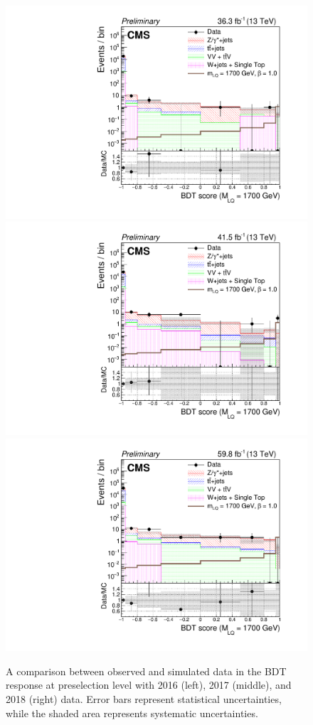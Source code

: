 \begin{figure}[H]
    {\includegraphics[width=.32\textwidth]{Images/Analysis/Results_2016_Unblinded/Plots/Preselection/BasicLQ_uujj_LQToBMu_pair_uubj_BDT_discrim_M1700_standard.pdf}}
    {\includegraphics[width=.32\textwidth]{Images/Analysis/Results_2017_Unblinded/Plots/Preselection/BasicLQ_uujj_LQToBMu_pair_uubj_BDT_discrim_M1700_standard.pdf}}
    {\includegraphics[width=.32\textwidth]{Images/Analysis/Results_2018_Unblinded/Plots/Preselection/BasicLQ_uujj_LQToBMu_pair_uubj_BDT_discrim_M1700_standard.pdf}}
    \caption{A comparison between observed and simulated data in the BDT response at preselection level with 2016 (left), 2017 (middle), and 2018 (right) data. Error bars represent statistical uncertainties, while the shaded area represents systematic uncertainties.}
    \label{figapp:BDT1500to1700}
\end{figure}

